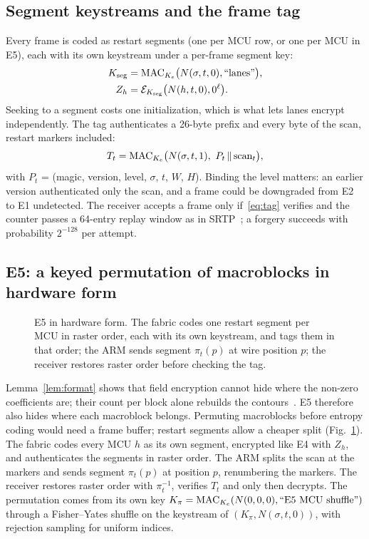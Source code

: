 \subsection{Segment keystreams and the frame tag}\label{sec:tag}
Every frame is coded as restart segments (one per MCU row, or one per MCU in E5), each with its own keystream under a per-frame segment key:
\begin{align}
K_{\mathrm{seg}} &= \mathrm{MAC}_{K_e}\bigl(N(\sigma, t, 0), \text{``lanes''}\bigr), \label{eq:kseg}\\
Z_h &= \mathcal{E}_{K_{\mathrm{seg}}}\bigl(N(h, t, 0), 0^{\ell}\bigr). \label{eq:zs}
\end{align}
Seeking to a segment costs one initialization, which is what lets lanes encrypt independently. The tag authenticates a 26-byte prefix and every byte of the scan, restart markers included:
\begin{equation}
T_t = \mathrm{MAC}_{K_e}\bigl(N(\sigma, t, 1),\ P_t \,\|\, \text{scan}_t\bigr),
\label{eq:tag}
\end{equation}
with $P_t$ = (magic, version, level, $\sigma$, $t$, $W$, $H$). Binding the level matters: an earlier version authenticated only the scan, and a frame could be downgraded from E2 to E1 undetected. The receiver accepts a frame only if~\eqref{eq:tag} verifies and the counter passes a 64-entry replay window as in SRTP~\cite{rfc3711}; a forgery succeeds with probability $2^{-128}$ per attempt.

\subsection{E5: a keyed permutation of macroblocks in hardware form}\label{sec:e5}
\begin{figure}[t]
\centering
\resizebox{\columnwidth}{!}{}
\caption{E5 in hardware form. The fabric codes one restart segment per MCU in raster order, each with its own keystream, and tags them in that order; the ARM sends segment $\pi_t(p)$ at wire position $p$; the receiver restores raster order before checking the tag.}
\label{fig:e5}
\end{figure}
Lemma~\ref{lem:format} shows that field encryption cannot hide where the non-zero coefficients are; their count per block alone rebuilds the contours~\cite{hirose2024}. E5 therefore also hides where each macroblock belongs. Permuting macroblocks before entropy coding would need a frame buffer; restart segments allow a cheaper split (Fig.~\ref{fig:e5}). The fabric codes every MCU $h$ as its own segment, encrypted like E4 with $Z_h$, and authenticates the segments in raster order. The ARM splits the scan at the markers and sends segment $\pi_t(p)$ at position $p$, renumbering the markers. The receiver restores raster order with $\pi_t^{-1}$, verifies $T_t$ and only then decrypts. The permutation comes from its own key $K_\pi = \mathrm{MAC}_{K_e}(N(0,0,0), \text{``E5 MCU shuffle''})$ through a Fisher--Yates shuffle on the keystream of $(K_\pi, N(\sigma, t, 0))$, with rejection sampling for uniform indices.

